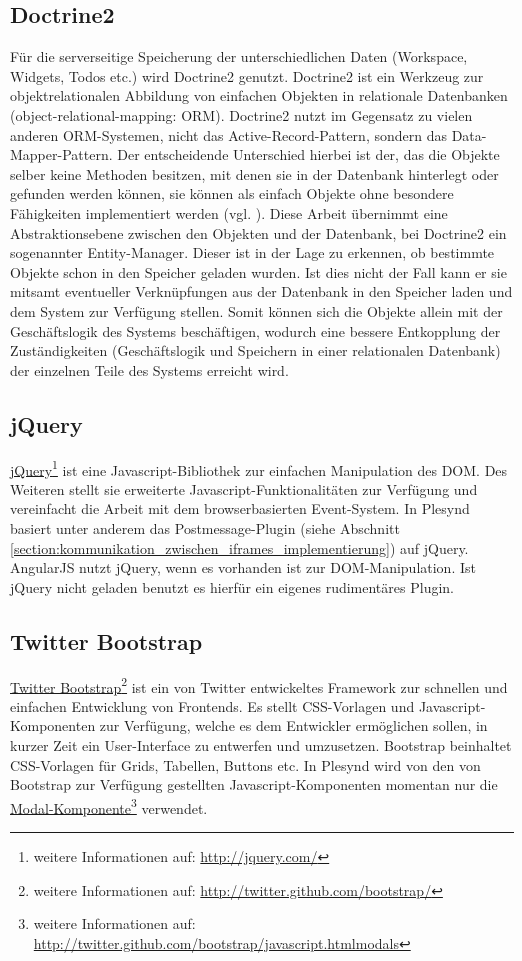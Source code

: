 \subsection{Doctrine2}\label{section:doctrine2}
Für die serverseitige Speicherung der unterschiedlichen Daten (Workspace, Widgets, Todos etc.) wird Doctrine2 genutzt. Doctrine2 ist ein Werkzeug zur objektrelationalen Abbildung von einfachen Objekten in relationale Datenbanken (object-relational-mapping: ORM). Doctrine2 nutzt im Gegensatz zu vielen anderen ORM-Systemen, nicht das Active-Record-Pattern, sondern das Data-Mapper-Pattern. Der entscheidende Unterschied hierbei ist der, das die Objekte selber keine Methoden besitzen, mit denen sie in der Datenbank hinterlegt oder gefunden werden können, sie können als einfach Objekte ohne besondere Fähigkeiten implementiert werden (vgl. \cite{Fowler2002}). Diese Arbeit übernimmt eine Abstraktionsebene zwischen den Objekten und der Datenbank, bei Doctrine2 ein sogenannter Entity-Manager. Dieser ist in der Lage zu erkennen, ob bestimmte Objekte schon in den Speicher geladen wurden. Ist dies nicht der Fall kann er sie mitsamt eventueller Verknüpfungen aus der Datenbank in den Speicher laden und dem System zur Verfügung stellen. Somit können sich die Objekte allein mit der Geschäftslogik des Systems beschäftigen, wodurch eine bessere Entkopplung der Zuständigkeiten (Geschäftslogik und Speichern in einer relationalen Datenbank) der einzelnen Teile des Systems erreicht wird.

\subsection{jQuery}
\href{http://jquery.com/}{jQuery}\footnote{weitere Informationen auf: \url{http://jquery.com/}} ist eine Javascript-Bibliothek zur einfachen Manipulation des DOM. Des Weiteren stellt sie erweiterte Javascript-Funktionalitäten zur Verfügung und vereinfacht die Arbeit mit dem browserbasierten Event-System. In Plesynd basiert unter anderem das Postmessage-Plugin (siehe Abschnitt \ref{section:kommunikation_zwischen_iframes_implementierung}) auf jQuery. AngularJS nutzt jQuery, wenn es vorhanden ist zur DOM-Manipulation. Ist jQuery nicht geladen benutzt es hierfür ein eigenes rudimentäres Plugin.

\subsection{Twitter Bootstrap}
\href{http://twitter.github.com/bootstrap/}{Twitter Bootstrap}\footnote{weitere Informationen auf: \url{http://twitter.github.com/bootstrap/}} ist ein von Twitter entwickeltes Framework zur schnellen und einfachen Entwicklung von Frontends. Es stellt CSS-Vorlagen und Javascript-Komponenten zur Verfügung, welche es dem Entwickler ermöglichen sollen, in kurzer Zeit ein User-Interface zu entwerfen und umzusetzen. Bootstrap beinhaltet CSS-Vorlagen für Grids, Tabellen, Buttons etc. In Plesynd wird von den von Bootstrap zur Verfügung gestellten Javascript-Komponenten momentan nur die \href{http://twitter.github.com/bootstrap/javascript.htmlmodals}{Modal-Komponente}\footnote{weitere Informationen auf: \url{http://twitter.github.com/bootstrap/javascript.htmlmodals}} verwendet. 

